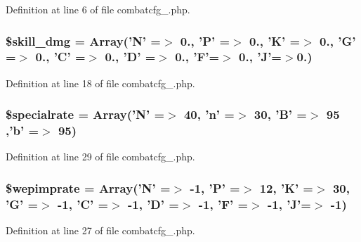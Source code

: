 Definition at line 6 of file combatcfg\+\_.\+php.

\hypertarget{combatcfg__1_8php_a73b7c90b0a42c3922eaeb5c2a4ffa88c}{
\subsubsection[{\$skill\+\_\+dmg}]{\setlength{\rightskip}{0pt plus 5cm}\$skill\+\_\+dmg = Array('N' =$>$ 0., 'P' =$>$ 0., 'K' =$>$ 0., 'G' =$>$ 0., 'C' =$>$ 0., 'D' =$>$ 0., 'F'=$>$ 0., 'J'=$>$0.)}}\label{combatcfg__1_8php_a73b7c90b0a42c3922eaeb5c2a4ffa88c}


Definition at line 18 of file combatcfg\+\_.\+php.

\hypertarget{combatcfg__1_8php_a713512757afc958b5469b5db12787304}{
\subsubsection[{\$specialrate}]{\setlength{\rightskip}{0pt plus 5cm}\$specialrate = Array('N' =$>$ 40, 'n' =$>$ 30, 'B' =$>$ 95 ,'b' =$>$ 95)}}\label{combatcfg__1_8php_a713512757afc958b5469b5db12787304}


Definition at line 29 of file combatcfg\+\_.\+php.

\hypertarget{combatcfg__1_8php_abcad788dd67419b2bf7d3f3e95ba884d}{
\subsubsection[{\$wepimprate}]{\setlength{\rightskip}{0pt plus 5cm}\$wepimprate = Array('N' =$>$ -\/1, 'P' =$>$ 12, 'K' =$>$ 30, 'G' =$>$ -\/1, 'C' =$>$ -\/1, 'D' =$>$ -\/1, 'F' =$>$ -\/1, 'J'=$>$ -\/1)}}\label{combatcfg__1_8php_abcad788dd67419b2bf7d3f3e95ba884d}


Definition at line 27 of file combatcfg\+\_.\+php.

